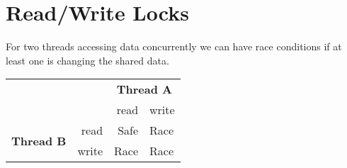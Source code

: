 \documentclass{report}
\begin{document}
\section*{Read/Write Locks}
For two threads accessing data concurrently we can have race conditions if at least one is changing the shared data.
\begin{center}
	\begin{tabular}{c r r l}
		                                   &       & \multicolumn{2}{c}{\textbf{Thread A}}         \\
		                                   &       & read                                  & write \\
		\multirow{2}{*}{\textbf{Thread B}} & read  & Safe                                  & Race  \\
		                                   & write & Race                                  & Race  \\
	\end{tabular}
\end{center}
\begin{minipage}[t]{0.4 \textwidth}
\end{minipage}
\begin{minipage}[t]{0.2 \textwidth}
	\
\end{minipage}
\begin{minipage}[t]{0.4 \textwidth}
\end{minipage}
\begin{itemize}
\end{itemize}
\end{document}
